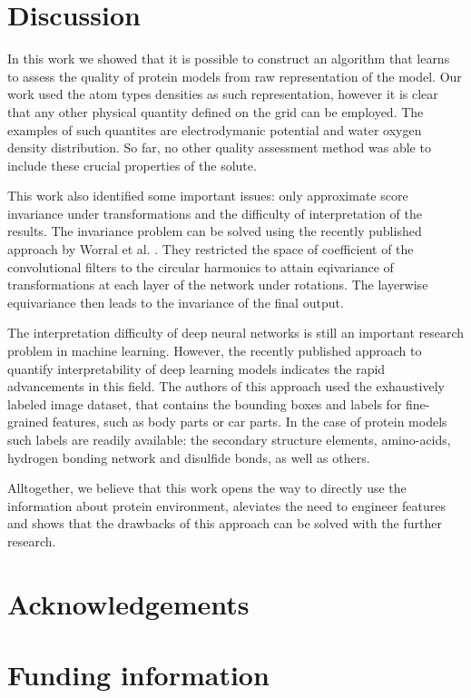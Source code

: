\documentclass{bioinfo}
\begin{document}
\section{Discussion}

In this work we showed that it is possible to construct an algorithm that learns to assess the quality of protein models from 
raw representation of the model. Our work used the atom types densities as such representation, however it is clear that 
any other physical quantity defined on the grid can be employed. The examples of such quantites are electrodymanic potential and 
water oxygen density distribution. So far, no other quality assessment method was able to include these 
crucial properties of the solute.

This work also identified some important issues: only approximate score invariance under transformations and the difficulty of 
interpretation of the results. The invariance problem can be solved using the recently published approach by Worral et al. \citep{worrall2016harmonic}.
They restricted the space of coefficient of the convolutional filters to the circular harmonics to attain eqivariance of transformations at each layer 
of the network under rotations. The layerwise equivariance then leads to the invariance of the final output.

The interpretation difficulty of deep neural networks is still an important research problem in machine learning. However, the recently 
published approach to quantify interpretability \citep{bau2017network} of deep learning models indicates the rapid advancements in this field. 
The authors of this approach used the exhaustively labeled image dataset, that contains the bounding boxes and labels for 
fine-grained features, such as body parts or car parts. In the case of protein models such labels are readily available: 
the secondary structure elements, amino-acids, hydrogen bonding network and disulfide bonds, as well as others.

Alltogether, we believe that this work opens the way to directly use the information about protein environment, aleviates the need to 
engineer features and shows that the drawbacks of this approach can be solved with the further research. 

\section{Acknowledgements}
\section{Funding information}



\end{document}
